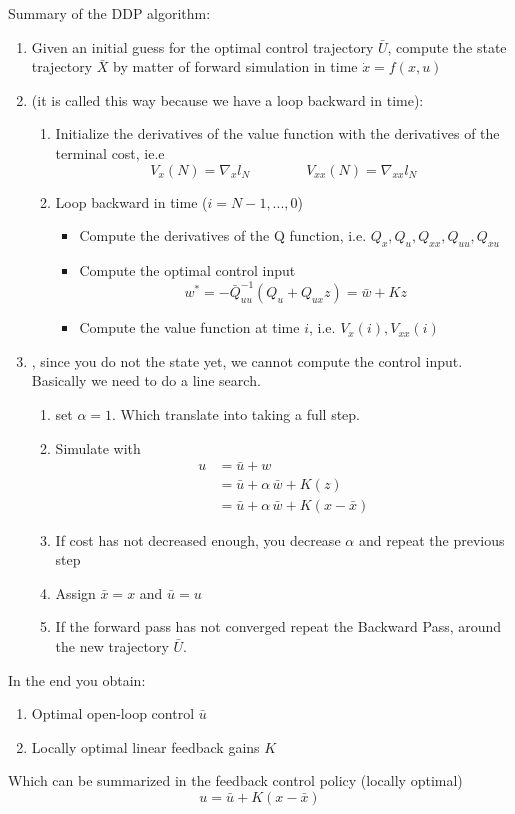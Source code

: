 Summary of the DDP algorithm:
\begin{enumerate}
\item Given an initial guess for the optimal control trajectory $\bar{U}$, compute the state trajectory $\bar{X}$ by matter of forward simulation in time $\dot{x} = f(x,u)$
\item {} (it is called this way because we have a loop backward in time):
\begin{enumerate}
\item Initialize the derivatives of the value function with the derivatives of the terminal cost, ie.e
\[V_x(N) = \nabla_xl_N\qquad\qquad V_{xx}(N) = \nabla_{xx}l_N\]
\item Loop backward in time ($i = N-1, ..., 0$)
\begin{itemize}
\item Compute the derivatives of the Q function, i.e. $Q_x, Q_u, Q_{xx}, Q_{uu}, Q_{xu}$
\item Compute the optimal control input 
\[w^* = -\bar{Q}_{uu}^{-1}(Q_u + Q_{ux}z) = \bar{w} + Kz\]
\item Compute the value function at time $i$, i.e. $V_{x}(i), V_{xx}(i)$
\end{itemize}
\end{enumerate}
\item {}, since you do not the state yet, we cannot compute the control input. Basically we need to do a line search.
\begin{enumerate}
\item set $\alpha = 1$. Which translate into taking a full step.
\item Simulate with 
\begin{align*}
u&=\bar{u} + w\\
&= \bar{u} + \alpha\,\bar{w} + K(z)\\
&= \bar{u} + \alpha\,\bar{w} + K(x - \bar{x})
\end{align*}
\item If cost has not decreased enough, you decrease $\alpha$ and repeat the previous step
\item Assign $\bar{x} = x$ and $\bar{u} = u$
\item If the forward pass has not converged repeat the Backward Pass, around the new trajectory $\bar{U}$.
\end{enumerate}
\end{enumerate}

In the end you obtain:
\begin{enumerate}
\item Optimal open-loop control $\bar{u}$
\item Locally optimal linear feedback gains $K$
\end{enumerate}
Which can be summarized in the feedback control policy (locally optimal)
\[u = \bar{u}+ K(x-\bar{x})\]

